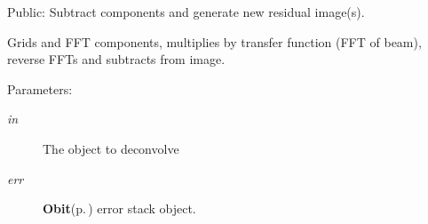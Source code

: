 Public: Subtract components and generate new residual image(s). 

Grids and FFT components, multiplies by transfer function (FFT of beam), reverse FFTs and subtracts from image. \begin{Desc}
\item[Parameters:]
\begin{description}
\item[{\em in}]The object to deconvolve \item[{\em err}]{\bf Obit}{\rm (p.\,\pageref{structObit})} error stack object. \end{description}
\end{Desc}
